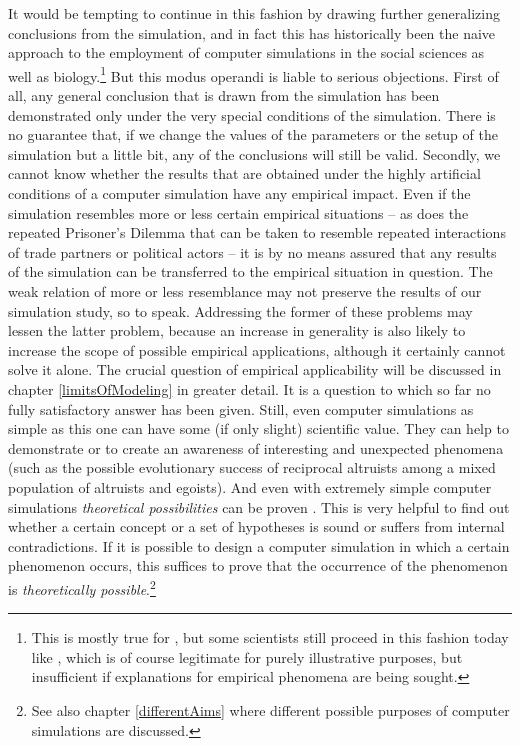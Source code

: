 It would be tempting to continue in this fashion by drawing further
generalizing conclusions from the simulation, and in fact this has
historically been the naive approach to the employment of computer simulations
in the social sciences as well as biology.\footnote{This is mostly true for
  \cite{axelrod:1984}, but some scientists still proceed in this fashion today
  like \cite{skyrms:1996, skyrms:2004}, which is of course legitimate for
  purely illustrative purposes, but insufficient if explanations for empirical
  phenomena are being sought.} But this modus operandi is liable to serious
objections.  First of all, any general conclusion that is drawn from the
simulation has been demonstrated only under the very special conditions of the
simulation.  There is no guarantee that, if we change the values of the
parameters or the setup of the simulation but a little bit, any of the
conclusions will still be valid.  Secondly, we cannot know whether the results
that are obtained under the highly artificial conditions of a computer
simulation have any empirical impact. Even if the simulation resembles more
or less certain empirical situations -- as does the repeated Prisoner's
Dilemma that can be taken to resemble repeated interactions of trade partners
or political actors -- it is by no means assured that any results of the
simulation can be transferred to the empirical situation in question. The weak
relation of more or less resemblance may not preserve the results of our
simulation study, so to speak. Addressing the former of these problems may lessen
the latter problem, because an increase in generality is also likely to
increase the scope of possible empirical applications, although it certainly
cannot solve it alone.  The crucial question of empirical applicability will
be discussed in chapter \ref{limitsOfModeling} in greater detail.  It is a
question to which so far no fully satisfactory answer has been given. Still,
even computer simulations as simple as this one can have some (if only slight)
scientific value. They can help to demonstrate or to create an awareness of
interesting and unexpected phenomena (such as the possible evolutionary
success of reciprocal altruists among a mixed population of altruists and
egoists).  And even with extremely simple computer simulations {\em
  theoretical possibilities} can be proven \cite[p.\  91]{schuessler:1997}.
This is very helpful to find out whether a certain concept or a set of
hypotheses is sound or suffers from internal contradictions. If it is possible
to design a computer simulation in which a certain phenomenon occurs, this
suffices to prove that the occurrence of the phenomenon is {\em theoretically
  possible}.\footnote{See also chapter \ref{differentAims} where different
  possible purposes of computer simulations are discussed.}

